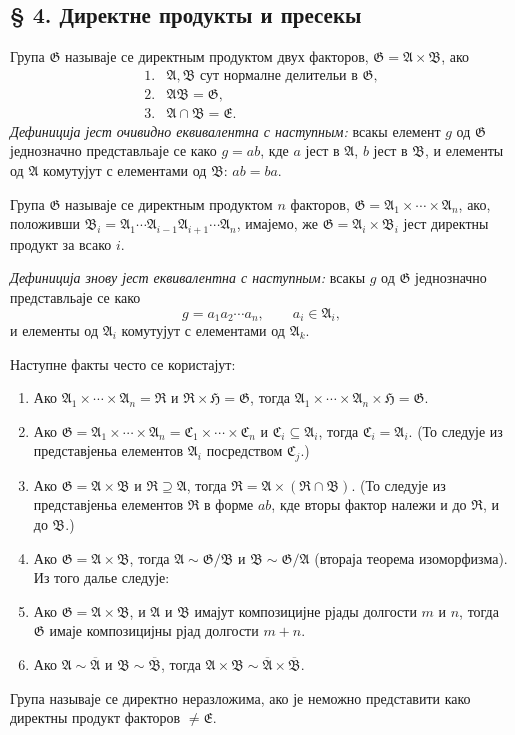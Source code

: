 ﻿\documentclass[11pt]{article}
\providecommand{\mG}{\mathfrak{G}}
\providecommand{\mA}{\mathfrak{A}}
\providecommand{\mB}{\mathfrak{B}}
\providecommand{\mE}{\mathfrak{E}}
\providecommand{\mH}{\mathfrak{H}}
\providecommand{\mC}{\mathfrak{C}}
\providecommand{\mR}{\mathfrak{R}}
\begin{document}
\setcounter{footnote}{10}

\subsection*{§ 4. Директне продукты и пресекы}

Група $\mG$ называје се директным продуктом двух факторов, $\mG=\mA\times\mB$, ако
\[
\begin{array}{ll}
1.& \mA,\mB\text{ сут нормалне делительи в }\mG,\\
2.& \mA\mB=\mG,\\
3.& \mA\cap\mB=\mE.
\end{array}
\]
\emph{Дефиниција јест очивидно еквивалентна с наступным:} всакы елемент $g$ од $\mG$ једнозначно представльаје се како $g=ab$, кде $a$ јест в $\mA$, $b$ јест в $\mB$, и елементы од $\mA$ комутујут с елементами од $\mB$: $ab=ba$.

Група $\mG$ называје се директным продуктом $n$ факторов, $\mG=\mA_1\times\cdots\times\mA_n$, ако, положивши $\mB_i=\mA_1\cdots\mA_{i-1}\mA_{i+1}\cdots\mA_n$, имајемо, же $\mG=\mA_i\times\mB_i$ јест директны продукт за всако $i$.

\emph{Дефиниција знову јест еквивалентна с наступным:} всакы $g$ од $\mG$ једнозначно представльаје се како
\[
        g=a_1a_2\cdots a_n,\qquad a_i\in\mA_i,
\]
и елементы од $\mA_i$ комутујут с елементами од $\mA_k$.

Наступне факты често се користајут:
\begin{enumerate}
\item Ако $\mA_1\times\cdots\times\mA_n=\mR$ и $\mR\times\mH=\mG$, тогда $\mA_1\times\cdots\times\mA_n\times\mH=\mG$.
\item Ако $\mG=\mA_1\times\cdots\times\mA_n=\mC_1\times\cdots\times\mC_n$ и $\mC_i\subseteq\mA_i$, тогда $\mC_i=\mA_i$. (То следује из представјеньа елементов $\mA_i$ посредством $\mC_j$.)
\item Ако $\mG=\mA\times\mB$ и $\mR\supseteq\mA$, тогда $\mR=\mA\times(\mR\cap\mB)$. (То следује из представјеньа елементов $\mR$ в форме $ab$, кде вторы фактор належи и до $\mR$, и до $\mB$.)
\item Ако $\mG=\mA\times\mB$, тогда $\mA\sim\mG/\mB$ и $\mB\sim\mG/\mA$ (втораја теорема изоморфизма). Из того далье следује:
\item Ако $\mG=\mA\times\mB$, и $\mA$ и $\mB$ имајут композицијне рјады долгости $m$ и $n$, тогда $\mG$ имаје композицијны рјад долгости $m+n$.
\item Ако $\mA\sim\overline{\mA}$ и $\mB\sim\overline{\mB}$, тогда $\mA\times\mB\sim\overline{\mA}\times\overline{\mB}$.
\end{enumerate}
Група называје се директно неразложима, ако је неможно представити како директны продукт факторов $\ne\mE$.
\end{document}
